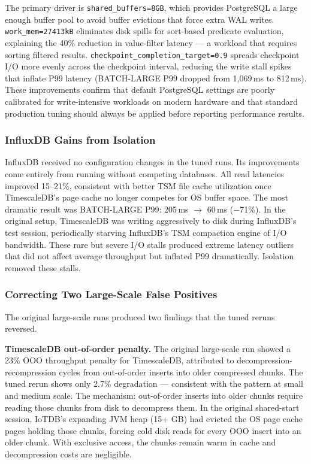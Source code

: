 The primary driver is \texttt{shared\_buffers=8GB}, which provides PostgreSQL a large
enough buffer pool to avoid buffer evictions that force extra WAL writes.
\texttt{work\_mem=27413kB} eliminates disk spills for sort-based predicate evaluation,
explaining the 40\% reduction in value-filter latency --- a workload that requires sorting
filtered results. \texttt{checkpoint\_completion\_target=0.9} spreads checkpoint I/O more
evenly across the checkpoint interval, reducing the write stall spikes that inflate P99
latency (BATCH-LARGE P99 dropped from 1{,}069\,ms to 812\,ms). These improvements
confirm that default PostgreSQL settings are poorly calibrated for write-intensive workloads
on modern hardware and that standard production tuning should always be applied before
reporting performance results.

\subsubsection{InfluxDB Gains from Isolation}

InfluxDB received no configuration changes in the tuned runs. Its improvements come entirely
from running without competing databases. All read latencies improved 15--21\%, consistent
with better TSM file cache utilization once TimescaleDB's page cache no longer competes for
OS buffer space. The most dramatic result was BATCH-LARGE P99: 205\,ms $\to$ 60\,ms
($-$71\%). In the original setup, TimescaleDB was writing aggressively to disk during
InfluxDB's test session, periodically starving InfluxDB's TSM compaction engine of I/O
bandwidth. These rare but severe I/O stalls produced extreme latency outliers that did not
affect average throughput but inflated P99 dramatically. Isolation removed these stalls.

\subsubsection{Correcting Two Large-Scale False Positives}

The original large-scale runs produced two findings that the tuned reruns reversed.

\textbf{TimescaleDB out-of-order penalty.} The original large-scale run showed a 23\%
OOO throughput penalty for TimescaleDB, attributed to decompression-recompression cycles
from out-of-order inserts into older compressed chunks. The tuned rerun shows only 2.7\%
degradation --- consistent with the pattern at small and medium scale. The mechanism:
out-of-order inserts into older chunks require reading those chunks from disk to decompress
them. In the original shared-start session, IoTDB's expanding JVM heap (15+ GB) had evicted
the OS page cache pages holding those chunks, forcing cold disk reads for every OOO insert
into an older chunk. With exclusive access, the chunks remain warm in cache and decompression
costs are negligible.

